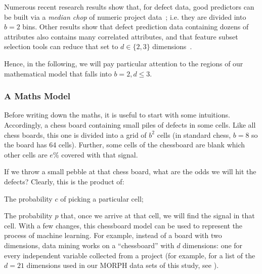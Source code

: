 Numerous recent
research results show that, for defect data, good
predictors can be built via a {\em median chop} of
numeric project data~\cite{Zhang2014,nam2015clami};
i.e. they are divided into $b=2$ bins. Other results
show that defect prediction data containing dozens
of attributes also contains many correlated
attributes, and that feature subset selection tools
can reduce that set to $d \in \{2,3\}$
dimensions~\cite{Menzies07}.

Hence, in the following, we will pay particular attention to the regions of our mathematical model
that falls into $b=2, d \le 3$.

\subsubsection{A Maths Model}

Before writing down the maths, it is useful to start with some intuitions.
Accordingly, a chess board  containing small  piles of defects in some cells.
Like all chess boards, this one is  divided into a grid of $b^2$ cells (in standard chess, $b=8$ so the board has 64 cells).
Further, some cells of the chessboard are blank which other cells are $e$\% covered
with that signal.

If we throw a small pebble at that chess board, what are the odds
we will hit the defects?
Clearly, this is the product of:
\bi
\item The probability $c$ of picking a particular cell;
\item The probability $p$ that, once we arrive at that cell, we will find  the  signal in that cell.
\ei
With a few changes, this chessboard model can be
used to represent the process of machine
learning. For example,
instead of a board with two
dimensions, data mining works on a ``chessboard''
with $d$ dimensions: one for every independent
variable collected from a project (for example, for a list of the
$d=21$ dimensions used in our MORPH data sets of this study,
see ).

